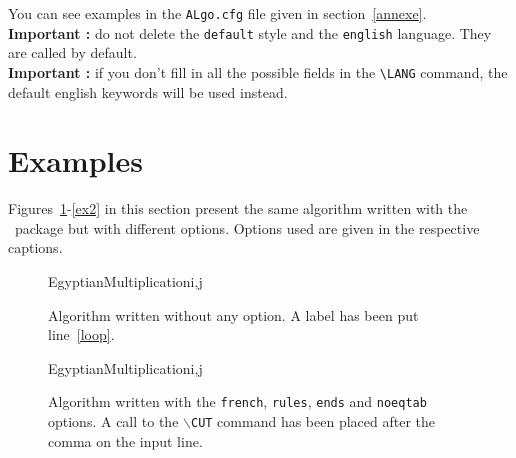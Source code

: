 \documentclass{article}
\begin{document}
You can see examples in the \verb!ALgo.cfg! file given in section~\ref{annexe}.\\ 

\textbf{Important : }do not delete the \verb!default! style and the \verb!english! language. They are called by default.\\

\textbf{Important : }if you don't fill in all the possible fields in the \verb!\LANG! command, the default english keywords will be used instead.  

\section{Examples}

Figures~\ref{ex1}-\ref{ex2} in this section present the same 
 algorithm written with the
 \ALgo\ package but with different options. 
Options used are given in the respective captions.

\begin{figure}[!h]
\begin{center}
\begin{algo}{EgyptianMultiplication}{i,j}
\OD
{}
  \FI
\OD
{}
\end{algo}
\end{center}
\caption{\label{ex1}Algorithm written without any option. A label has been
 put line~\ref{loop}.}
\end{figure}

\begin{figure}[!h]
\begin{center}
\begin{algo}{EgyptianMultiplication}{i,j}
\OD
{}
  \FI
\OD
{}
\end{algo}
\end{center}
\caption{Algorithm written with the \texttt{french}, \texttt{rules},
 \texttt{ends} and \texttt{noeqtab} options. A call to the \texttt{$\backslash$CUT} 
  command has been placed after the comma on the input line.}
\end{figure}
\end{document}
